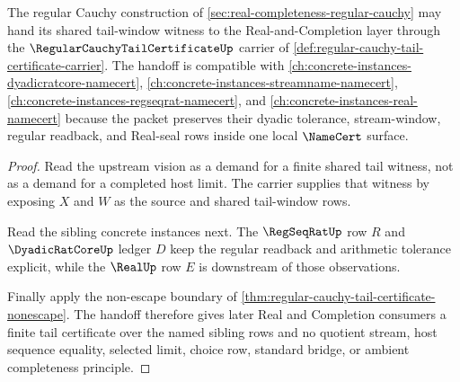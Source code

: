 \begin{theorem}
\label{thm:regular-cauchy-tail-certificate-vision-handoff}
The regular Cauchy construction of \autoref{sec:real-completeness-regular-cauchy} may hand its shared tail-window witness to the Real-and-Completion layer through the $\RegularCauchyTailCertificateUp$ carrier of \autoref{def:regular-cauchy-tail-certificate-carrier}. The handoff is compatible with \autoref{ch:concrete-instances-dyadicratcore-namecert}, \autoref{ch:concrete-instances-streamname-namecert}, \autoref{ch:concrete-instances-regseqrat-namecert}, and \autoref{ch:concrete-instances-real-namecert} because the packet preserves their dyadic tolerance, stream-window, regular readback, and Real-seal rows inside one local $\NameCert$ surface.
\end{theorem}
\begin{proof}
Read the upstream vision as a demand for a finite shared tail witness, not as a demand for a completed host limit. The carrier supplies that witness by exposing $X$ and $W$ as the source and shared tail-window rows.

Read the sibling concrete instances next. The $\RegSeqRatUp$ row $R$ and $\DyadicRatCoreUp$ ledger $D$ keep the regular readback and arithmetic tolerance explicit, while the $\RealUp$ row $E$ is downstream of those observations.

Finally apply the non-escape boundary of \autoref{thm:regular-cauchy-tail-certificate-nonescape}. The handoff therefore gives later Real and Completion consumers a finite tail certificate over the named sibling rows and no quotient stream, host sequence equality, selected limit, choice row, standard bridge, or ambient completeness principle.
\end{proof}

